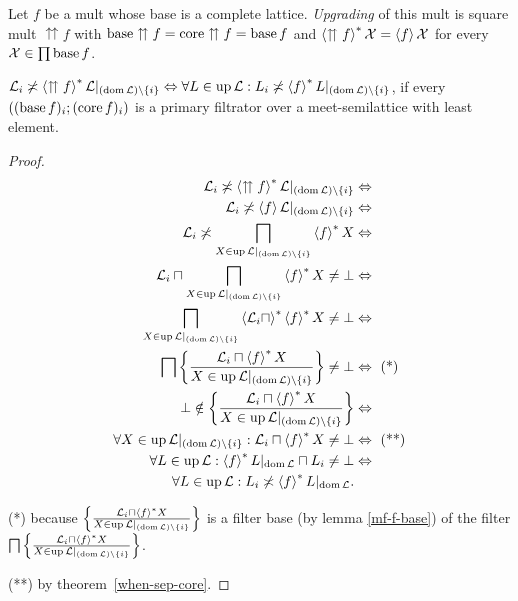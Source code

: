 \begin{defn}
Let $f$ be a mult whose base is a complete lattice. \emph{Upgrading}
of this mult is square mult $\upuparrows f$ with $\operatorname{base}\upuparrows f=\operatorname{core}\upuparrows f=\operatorname{base} f$
and $\left\langle \upuparrows f\right\rangle ^{\ast}\mathcal{X}=\left\langle f\right\rangle\mathcal{X}$ for
every $\mathcal{X}\in\prod\operatorname{base} f$.\end{defn}
\begin{lem}
$\mathcal{L}_{i}\not\asymp\left\langle \upuparrows f\right\rangle ^{\ast}\mathcal{L}|_{(\operatorname{dom}\mathcal{L})\setminus\{i\}}\Leftrightarrow\forall L\in\operatorname{up}\mathcal{L}:L_{i}\not\asymp\left\langle f\right\rangle ^{\ast}L|_{(\operatorname{dom}\mathcal{L})\setminus\{i\}}$,
if every $((\operatorname{base} f)_{i};(\operatorname{core} f)_{i})$ is a primary filtrator over
a meet-semilattice with least element.\end{lem}
\begin{proof}
~
\begin{align*}
\mathcal{L}_{i}\not\asymp\left\langle \upuparrows f\right\rangle ^{\ast}\mathcal{L}|_{(\operatorname{dom}\mathcal{L})\setminus\{i\}} & \Leftrightarrow\\
\mathcal{L}_{i}\not\asymp\left\langle f\right\rangle\mathcal{L}|_{(\operatorname{dom}\mathcal{L})\setminus\{i\}} & \Leftrightarrow\\
\mathcal{L}_{i}\not\asymp\bigsqcap_{X\in\operatorname{up}\mathcal{L}|_{(\operatorname{dom}\mathcal{L})\setminus\{i\}}}\left\langle f\right\rangle ^{\ast}X & \Leftrightarrow\\
\mathcal{L}_{i}\sqcap\bigsqcap_{X\in\operatorname{up}\mathcal{L}|_{(\operatorname{dom}\mathcal{L})\setminus\{i\}}}\left\langle f\right\rangle ^{\ast}X\ne\bot & \Leftrightarrow\\
\bigsqcap_{X\in\operatorname{up}\mathcal{L}|_{(\operatorname{dom}\mathcal{L})\setminus\{i\}}}\left\langle \mathcal{L}_{i}\sqcap\right\rangle ^{\ast}\left\langle f\right\rangle ^{\ast}X\ne\bot & \Leftrightarrow\\
\bigsqcap\left\{ \frac{\mathcal{L}_{i}\sqcap\left\langle f\right\rangle ^{\ast}X}{X\in\operatorname{up}\mathcal{L}|_{(\operatorname{dom}\mathcal{L})\setminus\{i\}}}\right\}\ne\bot & \Leftrightarrow\text{ (*)}\\
\bot\notin\left\{ \frac{\mathcal{L}_{i}\sqcap\left\langle f\right\rangle ^{\ast}X}{X\in\operatorname{up}\mathcal{L}|_{(\operatorname{dom}\mathcal{L})\setminus\{i\}}}\right\} & \Leftrightarrow\\
\forall X\in\operatorname{up}\mathcal{L}|_{(\operatorname{dom}\mathcal{L})\setminus\{i\}} : \mathcal{L}_{i}\sqcap\left\langle f\right\rangle ^{\ast}X \ne \bot & \Leftrightarrow\text{ (**)}\\
\forall L\in\operatorname{up}\mathcal{L}:\left\langle f\right\rangle ^{\ast}L|_{\operatorname{dom}\mathcal{L}}\sqcap L_{i}\ne\bot & \Leftrightarrow\\
\forall L\in\operatorname{up}\mathcal{L}:L_{i}\not\asymp\left\langle f\right\rangle ^{\ast}L|_{\operatorname{dom}\mathcal{L}}.
\end{align*}

({*}) because $\left\{ \frac{\mathcal{L}_{i}\sqcap\left\langle f\right\rangle ^{\ast}X}{X\in\operatorname{up}\mathcal{L}|_{(\operatorname{dom}\mathcal{L})\setminus\{i\}}}\right\}$
is a filter base (by lemma \ref{mf-f-base}) of the filter $\bigsqcap\left\{ \frac{\mathcal{L}_{i}\sqcap\left\langle f\right\rangle ^{\ast}X}{X\in\operatorname{up}\mathcal{L}|_{(\operatorname{dom}\mathcal{L})\setminus\{i\}}}\right\}$.

({**}) by theorem~\ref{when-sep-core}.
\end{proof}
